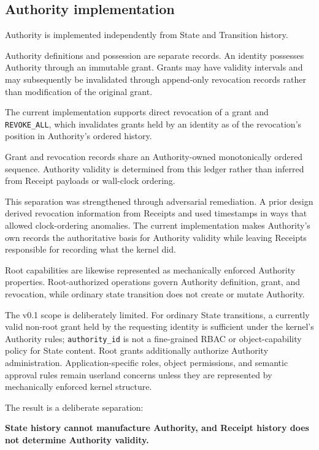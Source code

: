 \documentclass[11pt]{article}
\begin{document}
\subsection{Authority implementation}

Authority is implemented independently from State and Transition history.

Authority definitions and possession are separate records. An identity possesses Authority through an immutable grant. Grants may have validity intervals and may subsequently be invalidated through append-only revocation records rather than modification of the original grant.

The current implementation supports direct revocation of a grant and \texttt{REVOKE\_ALL}, which invalidates grants held by an identity as of the revocation's position in Authority's ordered history.

Grant and revocation records share an Authority-owned monotonically ordered sequence. Authority validity is determined from this ledger rather than inferred from Receipt payloads or wall-clock ordering.

This separation was strengthened through adversarial remediation. A prior design derived revocation information from Receipts and used timestamps in ways that allowed clock-ordering anomalies. The current implementation makes Authority's own records the authoritative basis for Authority validity while leaving Receipts responsible for recording what the kernel did.

Root capabilities are likewise represented as mechanically enforced Authority properties. Root-authorized operations govern Authority definition, grant, and revocation, while ordinary state transition does not create or mutate Authority.

The v0.1 scope is deliberately limited. For ordinary State transitions, a currently valid non-root grant held by the requesting identity is sufficient under the kernel's Authority rules; \texttt{authority\_id} is not a fine-grained RBAC or object-capability policy for State content. Root grants additionally authorize Authority administration. Application-specific roles, object permissions, and semantic approval rules remain userland concerns unless they are represented by mechanically enforced kernel structure.

The result is a deliberate separation:

\textbf{State history cannot manufacture Authority, and Receipt history does not determine Authority validity.}
\end{document}
